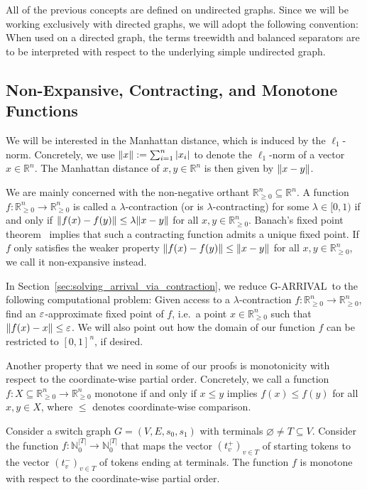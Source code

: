 \documentclass[a4paper,UKenglish,cleveref, autoref, thm-restate]{lipics-v2021}
\newcommand{\N}{\mathbb{N}}
\newcommand{\R}{\mathbb{R}}
\DeclarePairedDelimiter\norm{\lVert}{\rVert}
\let\emptyset\varnothing
\renewcommand{\epsilon}{\ensuremath\varepsilon}
\newcommand{\problem}[1]{\textrm{#1}}
\newcommand{\garrival}{\problem{G-ARRIVAL}}
\begin{document}
All of the previous concepts are defined on undirected graphs. Since we will be working exclusively with directed graphs, we will adopt the following convention: When used on a directed graph, the terms treewidth and balanced separators are to be interpreted with respect to the underlying simple undirected graph. 

\subsection{Non-Expansive, Contracting, and Monotone Functions}
\label{ssec:contraction_maps}

We will be interested in the Manhattan distance, which is induced by the $\ell_1$-norm. Concretely, we use $\norm{x} := \sum_{i = 1}^n |x_i|$ to denote the $\ell_1$-norm of a vector $x \in \R^n$. The Manhattan distance of $x, y \in \R^n$ is then given by $\norm{x - y}$. 

We are mainly concerned with the non-negative orthant $\R^n_{\geq 0} \subseteq \R^n$. A function $f : \R^n_{\geq 0} \rightarrow \R^n_{\geq 0}$ is called a $\lambda$-contraction (or is $\lambda$-contracting) for some $\lambda \in [0, 1)$ if and only if $\norm{f(x) - f(y)} \leq \lambda \norm{x - y}$ for all $x, y \in \R^n_{\geq 0}$. Banach's fixed point theorem~\cite{banach1922operations} implies that such a contracting function admits a unique fixed point. If $f$ only satisfies the weaker property $\norm{f(x) - f(y)} \leq \norm{x - y}$ for all $x, y \in \R^n_{\geq 0}$, we call it non-expansive instead.

In Section~\ref{sec:solving_arrival_via_contraction}, we reduce \garrival\ to the following computational problem: Given access to a $\lambda$-contraction $f : \R^n_{\geq 0} \rightarrow \R^n_{\geq 0}$, find an $\epsilon$-approximate fixed point of $f$, i.e.\ a point $x \in \R^n_{\geq 0}$ such that $\norm{f(x) - x} \leq \epsilon$. We will also point out how the domain of our function $f$ can be restricted to $[0, 1]^n$, if desired.

Another property that we need in some of our proofs is monotonicity with respect to the coordinate-wise partial order. Concretely, we call a function $f : X \subseteq \R^n_{\geq 0} \rightarrow \R^n_{\geq 0}$ monotone if and only if $x \leq y$ implies $f(x) \leq f(y)$ for all $x, y \in X$, where $\leq$ denotes coordinate-wise comparison.


\begin{lemma}[Monotonicity in \garrival\@~\cite{gartnerSubexponentialAlgorithmARRIVAL2021}]
\label{lemma:monotonicity_and_global_conservation}
    Consider a switch graph $G = (V, E, s_0, s_1)$ with terminals $\emptyset \neq T \subseteq V$. Consider the function $f : \N^{|T|}_0 \rightarrow \N^{|T|}_0$ that maps the vector $(t^+_v)_{v \in T}$ of starting tokens to the vector $(t^-_v)_{v \in T}$ of tokens ending at terminals. The function $f$ is monotone with respect to the coordinate-wise partial order.
\end{lemma}
\end{document}
